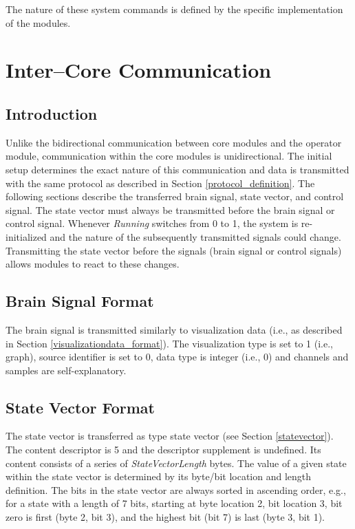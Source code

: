 \documentclass[letterpaper,oneside,12pt]{book}
\begin{document}
The nature of these system commands is defined by the specific implementation of 
the modules.


\section{Inter--Core Communication}

\subsection{Introduction}

Unlike the bidirectional communication between core modules and the operator 
module, communication within the core modules is unidirectional. The initial 
setup determines the exact nature of this communication and data is transmitted 
with the same protocol as described in Section \ref{protocol_definition}. The 
following sections describe the transferred brain signal, state vector, and 
control signal. The state vector must always be transmitted before the brain 
signal or control signal. Whenever \textit{Running} switches from 0 to 1, the 
system is re-initialized and the nature of the subsequently transmitted signals 
could change. Transmitting the state vector before the signals (brain signal or 
control signals) allows modules to react to these changes.

\subsection{Brain Signal Format}
\label{sec:eegsigformat}

The brain signal is transmitted similarly to visualization data (i.e., as 
described in Section \ref{visualizationdata_format}). The visualization type is 
set to 1 (i.e., graph), source identifier is set to 0, data type is integer 
(i.e., 0) and channels and samples are self-explanatory.


\subsection{State Vector Format}
\label{statevector_format}

The state vector is transferred as type state vector (see Section 
\ref{statevector}). The content descriptor is 5 and the descriptor supplement is 
undefined. Its content consists of a series of \textit{StateVectorLength} bytes. 
The value of a given state within the state vector is determined by its byte/bit 
location and length definition. The bits in the state vector are always sorted 
in ascending order, e.g., for a state with a length of 7 bits, starting at byte 
location 2, bit location 3, bit zero is first (byte 2, bit 3), and the highest 
bit (bit 7) is last (byte 3, bit 1).
\end{document}
